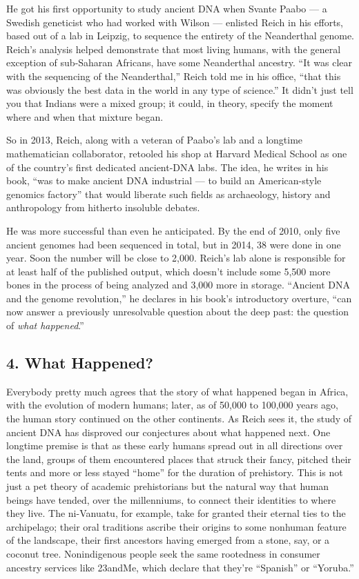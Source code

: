 He got his first opportunity to study ancient DNA when Svante Paabo ---
a Swedish geneticist who had worked with Wilson --- enlisted Reich in
his efforts, based out of a lab in Leipzig, to sequence the entirety of
the Neanderthal genome. Reich's analysis helped demonstrate that most
living humans, with the general exception of sub-Saharan Africans, have
some Neanderthal ancestry. ``It was clear with the sequencing of the
Neanderthal,'' Reich told me in his office, ``that this was obviously
the best data in the world in any type of science.'' It didn't just tell
you that Indians were a mixed group; it could, in theory, specify the
moment where and when that mixture began.

So in 2013, Reich, along with a veteran of Paabo's lab and a longtime
mathematician collaborator, retooled his shop at Harvard Medical School
as one of the country's first dedicated ancient-DNA labs. The idea, he
writes in his book, ``was to make ancient DNA industrial --- to build an
American-style genomics factory'' that would liberate such fields as
archaeology, history and anthropology from hitherto insoluble debates.

He was more successful than even he anticipated. By the end of 2010,
only five ancient genomes had been sequenced in total, but in 2014, 38
were done in one year. Soon the number will be close to 2,000. Reich's
lab alone is responsible for at least half of the published output,
which doesn't include some 5,500 more bones in the process of being
analyzed and 3,000 more in storage. ``Ancient DNA and the genome
revolution,'' he declares in his book's introductory overture, ``can now
answer a previously unresolvable question about the deep past: the
question of \emph{what happened}.''

\hypertarget{4-what-happened}{%
\subsection{\texorpdfstring{\textbf{4. What
Happened?}}{4. What Happened?}}\label{4-what-happened}}

Everybody pretty much agrees that the story of what happened began in
Africa, with the evolution of modern humans; later, as of 50,000 to
100,000 years ago, the human story continued on the other continents. As
Reich sees it, the study of ancient DNA has disproved our conjectures
about what happened next. One longtime premise is that as these early
humans spread out in all directions over the land, groups of them
encountered places that struck their fancy, pitched their tents and more
or less stayed ``home'' for the duration of prehistory. This is not just
a pet theory of academic prehistorians but the natural way that human
beings have tended, over the millenniums, to connect their identities to
where they live. The ni-Vanuatu, for example, take for granted their
eternal ties to the archipelago; their oral traditions ascribe their
origins to some nonhuman feature of the landscape, their first ancestors
having emerged from a stone, say, or a coconut tree. Nonindigenous
people seek the same rootedness in consumer ancestry services like
23andMe, which declare that they're ``Spanish'' or ``Yoruba.''

